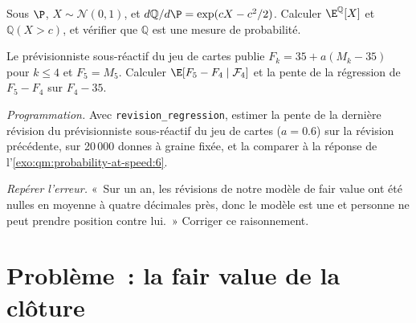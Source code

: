 \begin{exercise}[$\star\star$]\label{exo:qm:probability-at-speed:5}
Sous $\P$, $X \sim \mathcal N(0,1)$, et $d\mathbb Q/d\P = \exp(cX - c^2/2)$. Calculer $\E^{\mathbb
Q}[X]$ et $\mathbb Q(X > c)$, et vérifier que $\mathbb Q$ est une mesure de probabilité.
\end{exercise}

\begin{exercise}[$\star\star$]\label{exo:qm:probability-at-speed:6}
Le prévisionniste sous-réactif du jeu de cartes publie $F_k = 35 + a(M_k - 35)$ pour $k \le 4$ et $F_5 =
M_5$. Calculer $\E[F_5 - F_4 \mid \mathcal F_4]$ et la pente de la régression de $F_5 - F_4$ sur
$F_4 - 35$.
\end{exercise}

\begin{exercise}[$\star\star\star$]\label{exo:qm:probability-at-speed:7}
\emph{Programmation.} Avec \texttt{revision\_regression}, estimer la pente de la dernière révision
du prévisionniste sous-réactif du jeu de cartes ($a = 0.6$) sur la révision précédente, sur 20\,000
donnes à graine fixée, et la comparer à la réponse de l'\cref{exo:qm:probability-at-speed:6}.
\end{exercise}

\begin{exercise}[$\star\star\star$]\label{exo:qm:probability-at-speed:8}
\emph{Repérer l'erreur.} «~Sur un an, les révisions de notre modèle de fair value ont été nulles en moyenne à quatre
décimales près, donc le modèle est une  et personne ne peut prendre position contre lui.~» Corriger ce raisonnement.
\end{exercise}

\section{Problème~: la fair value de la clôture}

